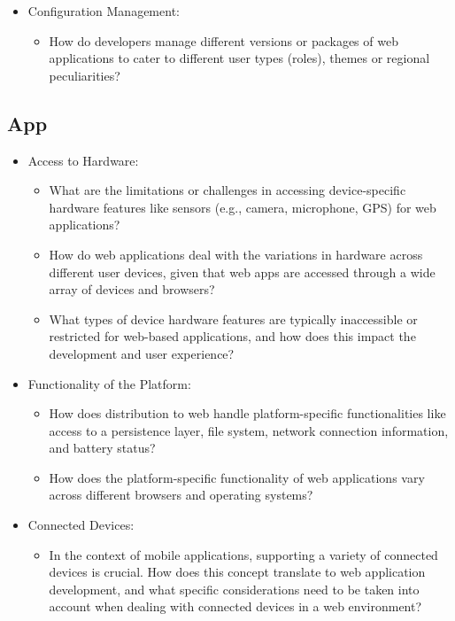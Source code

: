 \begin{itemize}
\begin{itemize}
    \end{itemize}
  \item Configuration Management:
    \begin{itemize}
      \item How do developers manage different versions or packages of web applications to cater to different user types (roles), themes or regional peculiarities?
    \end{itemize}
\end{itemize}

\subsection{App}

\begin{itemize}
  \item Access to Hardware:
    \begin{itemize}
      \item What are the limitations or challenges in accessing device-specific hardware features like sensors (e.g., camera, microphone, GPS) for web applications?
      \item How do web applications deal with the variations in hardware across different user devices, given that web apps are accessed through a wide array of devices and browsers?
      \item What types of device hardware features are typically inaccessible or restricted for web-based applications, and how does this impact the development and user experience?
    \end{itemize}
  \item Functionality of the Platform:
    \begin{itemize}
      \item How does distribution to web handle platform-specific functionalities like access to a persistence layer, file system, network connection information, and battery status?
      \item How does the platform-specific functionality of web applications vary across different browsers and operating systems?
    \end{itemize}
  \item Connected Devices:
    \begin{itemize}
      \item In the context of mobile applications, supporting a variety of connected devices is crucial. How does this concept translate to web application development, and what specific considerations need to be taken into account when dealing with connected devices in a web environment?

\end{itemize}
\end{itemize}
